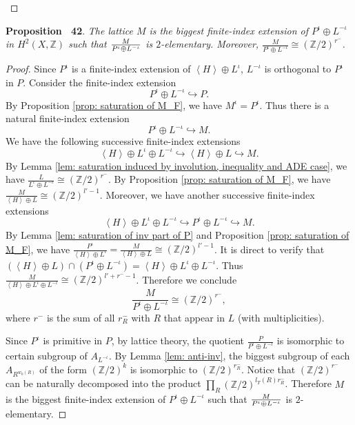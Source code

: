 \documentclass[
]{article}
\begin{document}
\label{tab: r_R^+}~◻

\textbf{Proposition~ 42}. \emph{\label{prop: M_F = Z_2-saturation} The
lattice \(M\) is the biggest finite-index extension of
\(P^\iota \oplus L^{-\iota}\) in \(H^2(X,\mathbb{Z})\) such that
\(M\over{P^{\iota}\oplus L^{-\iota}}\) is \(2\)-elementary. Moreover,
\(\frac{M}{P^{\iota}\oplus L^{-\iota}}\cong (\mathbb{Z}/2)^{r^-}\).}

\emph{Proof.} Since \(P^{\iota}\) is a finite-index extension of
\(\left\langle H\right\rangle\oplus L^{\iota}\), \(L^{-\iota}\) is
orthogonal to \(P^{\iota}\) in \(P\). Consider the finite-index
extension \[P^{\iota}\oplus L^{-\iota}\hookrightarrow P.\] By
Proposition \ref{prop: saturation of M_F}, we have
\(M^{\iota} = P^{\iota}\). Thus there is a natural finite-index
extension \[P^{\iota}\oplus L^{-\iota} \hookrightarrow M.\] We have the
following successive finite-index extensions
\[\left\langle H \right\rangle \oplus L^{\iota} \oplus L^{-\iota} \hookrightarrow \left\langle H \right\rangle \oplus L \hookrightarrow M.\]
By Lemma
\ref{lem: saturation induced by involution, inequality and ADE case}, we
have
\(\frac{L}{L^{\iota} \oplus L^{-\iota}} \cong (\mathbb{Z}/2)^{r^-}\). By
Proposition \ref{prop: saturation of M_F}, we have
\(\frac{M}{\left\langle H\right\rangle \oplus L}\cong (\mathbb{Z}/2)^{l'-1}\).
Moreover, we have another successive finite-index extensions
\[\left\langle H \right\rangle \oplus L^{\iota} \oplus L^{-\iota} \hookrightarrow P^{\iota}\oplus L^{-\iota} \hookrightarrow M.\]
By Lemma \ref{lem: saturation of inv part of P} and Proposition
\ref{prop: saturation of M_F}, we have
\(\frac{P^{\iota}}{\left\langle H \right\rangle \oplus L^{\iota}} = \frac{M}{\left\langle H \right\rangle \oplus L} \cong (\mathbb{Z}/2)^{l'-1}\).
It is direct to verify that
\((\left\langle H \right\rangle \oplus L)\cap (P^{\iota}\oplus L^{-\iota}) = \left\langle H \right\rangle \oplus L^\iota \oplus L^{-\iota}\).
Thus
\(\frac{M}{\left\langle H \right\rangle \oplus L^\iota \oplus L^{-\iota}} \cong (\mathbb{Z}/2)^{l'+r^--1}\).
Therefore we conclude
\[\label{eqn: saturation of M over P^iota oplus L^-iota}
        \frac{M}{P^{\iota}\oplus L^{-\iota}}\cong (\mathbb{Z}/2)^{r^-},\]
where \(r^-\) is the sum of all \(r_R^-\) with \(R\) that appear in
\(L\) (with multiplicities).

Since \(P^{\iota}\) is primitive in \(P\), by lattice theory, the
quotient \(\frac{P}{P^{\iota}\oplus L^{-\iota}}\) is isomorphic to
certain subgroup of \(A_{L^{-\iota}}\). By Lemma \ref{lem: anti-inv},
the biggest subgroup of each \(A_{R^{w_0(R)}}\) of the form
\((\mathbb{Z}/2)^k\) is isomorphic to \((\mathbb{Z}/2)^{r_R^-}\). Notice
that \((\mathbb{Z}/2)^{r^-}\) can be naturally decomposed into the
product \(\prod\limits_{R}(\mathbb{Z}/2)^{l_T(R)r_R^-}\). Therefore
\(M\) is the biggest finite-index extension of
\(P^{\iota}\oplus L^{-\iota}\) such that
\(M\over{P^{\iota}\oplus L^{-\iota}}\) is \(2\)-elementary.~◻
\end{document}
